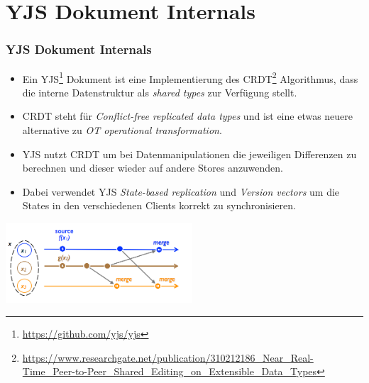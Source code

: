 \section{YJS Dokument Internals}
\begin{frame}
    \frametitle{YJS Dokument Internals}
    \begin{itemize}
        \item Ein YJS\footnote[frame]{\tiny \url {https://github.com/yjs/yjs}} Dokument ist eine Implementierung des CRDT\footnote[frame]{\tiny \url{https://www.researchgate.net/publication/310212186_Near_Real-Time_Peer-to-Peer_Shared_Editing_on_Extensible_Data_Types}} Algorithmus, dass die interne Datenstruktur als \textit{shared types} zur Verfügung stellt.
        \item CRDT steht für \textit{Conflict-free replicated data types} und ist eine etwas neuere alternative zu \textit{OT operational transformation}.
        \item YJS nutzt CRDT um bei Datenmanipulationen die jeweiligen Differenzen zu berechnen und dieser wieder auf andere Stores anzuwenden.
        \item Dabei verwendet YJS \textit{State-based replication} und \textit{Version vectors} um die States in den verschiedenen Clients korrekt zu synchronisieren.
    \end{itemize}
    \centering
    \includegraphics[height=3cm]{media/crdt}\label{fig:CRDT Sample}
\end{frame}
